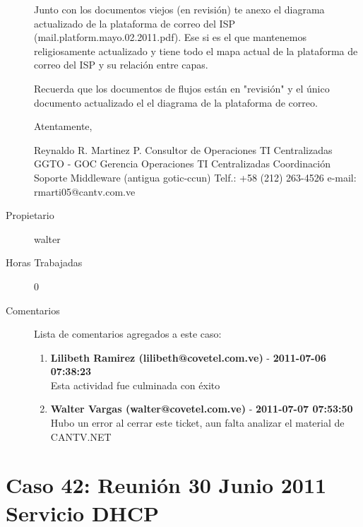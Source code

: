 \begin{description}
Junto con los documentos viejos (en revisión) te anexo el diagrama
actualizado de la plataforma de correo del ISP
(mail.platform.mayo.02.2011.pdf). Ese si es el que mantenemos
religiosamente actualizado y tiene todo el mapa actual de la plataforma
de correo del ISP y su relación entre capas.

Recuerda que los documentos de flujos están en "revisión" y el único
documento actualizado el el diagrama de la plataforma de correo.

Atentamente,

Reynaldo R. Martinez P.
Consultor de Operaciones TI Centralizadas
GGTO - GOC Gerencia Operaciones TI Centralizadas
Coordinación Soporte Middleware (antigua gotic-ccun)
Telf.: +58 (212) 263-4526
e-mail: rmarti05@cantv.com.ve\item[Propietario] walter\item[Horas Trabajadas] 0

\item[Comentarios] Lista de comentarios agregados a este caso:  
\begin{enumerate}
        \item {\bfseries Lilibeth Ramirez (lilibeth@covetel.com.ve)  } - {\bfseries 2011-07-06 07:38:23} \\ Esta actividad fue culminada con éxito        \item {\bfseries Walter Vargas (walter@covetel.com.ve)  } - {\bfseries 2011-07-07 07:53:50} \\ Hubo un error al cerrar este ticket, aun falta analizar el material de
CANTV.NET    \end{enumerate}

\end{description}

\section{Caso 42: Reunión 30 Junio 2011 Servicio DHCP }

